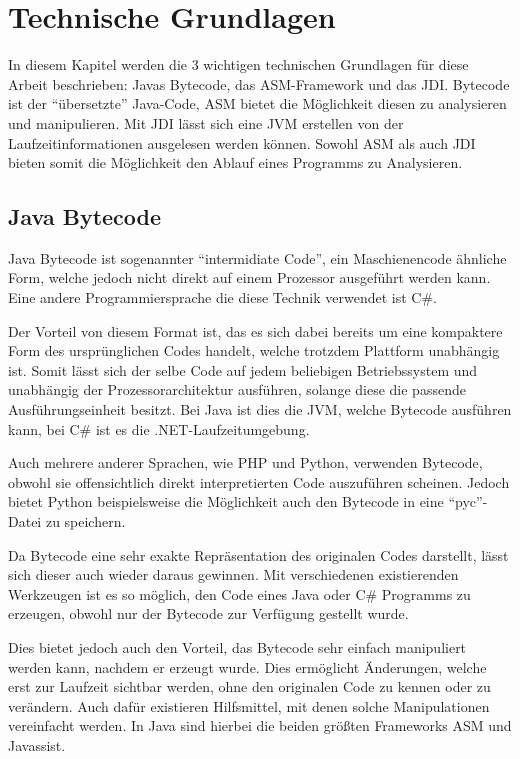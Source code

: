 
\chapter{Technische Grundlagen}

In diesem Kapitel werden die 3 wichtigen technischen Grundlagen für diese Arbeit beschrieben: Javas Bytecode, das ASM-Framework und das \ac{JDI}. Bytecode ist der "`übersetzte"' Java-Code, ASM bietet die Möglichkeit diesen zu analysieren und manipulieren. Mit \ac{JDI} lässt sich eine \ac{JVM} erstellen von der Laufzeitinformationen ausgelesen werden können. Sowohl ASM als auch \ac{JDI} bieten somit die Möglichkeit den Ablauf eines Programms zu Analysieren.

\section{Java Bytecode} 

Java Bytecode ist sogenannter "`intermidiate Code"', ein Maschienencode ähnliche Form, welche jedoch nicht direkt auf einem Prozessor ausgeführt werden kann. Eine andere Programmiersprache die diese Technik verwendet ist C\#.

Der Vorteil von diesem Format ist, das es sich dabei bereits um eine kompaktere Form des ursprünglichen Codes handelt, welche trotzdem Plattform unabhängig ist. Somit lässt sich der selbe Code auf jedem beliebigen Betriebssystem und unabhängig der Prozessorarchitektur ausführen, solange diese die passende Ausführungseinheit besitzt.
Bei Java ist dies die \ac{JVM}, welche Bytecode ausführen kann, bei C\# ist es die .NET-Laufzeitumgebung.

Auch mehrere anderer Sprachen, wie \ac{PHP} und Python, verwenden Bytecode, obwohl sie offensichtlich direkt interpretierten Code auszuführen scheinen. Jedoch bietet Python beispielsweise die Möglichkeit auch den Bytecode in eine "`pyc"'-Datei zu speichern.

Da Bytecode eine sehr exakte Repräsentation des originalen Codes darstellt, lässt sich dieser auch wieder daraus gewinnen. Mit verschiedenen existierenden Werkzeugen ist es so möglich, den Code eines Java oder C\# Programms zu erzeugen, obwohl nur der Bytecode zur Verfügung gestellt wurde.

Dies bietet jedoch auch den Vorteil, das Bytecode sehr einfach manipuliert werden kann, nachdem er erzeugt wurde. Dies ermöglicht Änderungen, welche erst zur Laufzeit sichtbar werden, ohne den originalen Code zu kennen oder zu verändern. Auch dafür existieren Hilfsmittel, mit denen solche Manipulationen vereinfacht werden. In Java sind hierbei die beiden größten Frameworks ASM und Javassist.

